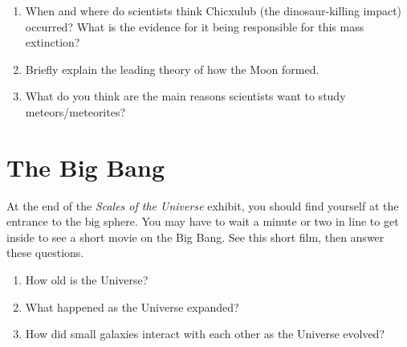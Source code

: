 \documentclass[12pt]{article}
\begin{document}
\begin{enumerate}
\item When and where do scientists think Chicxulub (the dinosaur-killing impact) 
occurred?  What is the evidence for it being responsible for this mass
extinction?

\vspace{3cm}


\item Briefly explain the leading theory of how the Moon formed. 

\vspace{2.5cm}




\item What do you think are the main reasons scientists want to study meteors/meteorites?  %

\end{enumerate}
\vspace{2cm}




\section{The Big Bang}
At the end of the \emph{Scales of the Universe} exhibit, you should find yourself at the entrance to the big sphere.  You may have to wait a minute or two in line to get inside to see a short movie on the Big Bang.  See this short film, then answer these questions.

\begin{enumerate}
\item How old is the Universe?
\vspace{0.3in}

\item What happened as the Universe expanded?
\vspace{1in}

\item How did small galaxies interact with each other as the Universe evolved?
\vspace{1.5in}

\end{enumerate}
\end{document}
